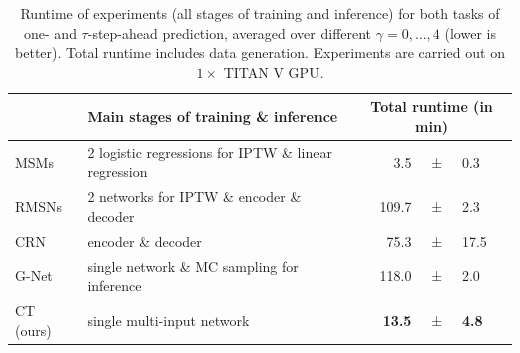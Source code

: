 \documentclass{article}
\theoremstyle{plain}
\theoremstyle{definition}
\theoremstyle{remark}
\begin{document}
\begin{table}[h!]
    \caption{Runtime of experiments (all stages of training and inference) for both tasks of one- and $\tau$-step-ahead prediction, averaged over different $\gamma = 0, \dots, 4$ (lower is better). Total runtime includes data generation. Experiments are carried out on $1\times$ TITAN V GPU.}
    \label{tab:tg-sim-runtime}
    \begin{center}
        \begin{small}
        \begin{tabular}{l|l|rcl}
            \toprule
                    & Main stages of training \& inference & \multicolumn{3}{c}{Total runtime (in min)} \\
            \midrule
             MSMs   & 2 logistic regressions for IPTW \& linear regression & 3.5 &±& 0.3  \\
             RMSNs  & 2 networks for IPTW \& encoder \& decoder & 109.7 &±& 2.3 \\
             CRN    & encoder \& decoder & 75.3 &±& 17.5 \\
             G-Net  & single network \& MC sampling for inference & 118.0 &±& 2.0 \\
             \midrule
             CT (ours)  & single multi-input network & \textbf{13.5} &±& \textbf{4.8} \\
             \bottomrule
        \end{tabular}
        \end{small}
    \end{center}
    \vskip -0.1in
\end{table}
\end{document}
